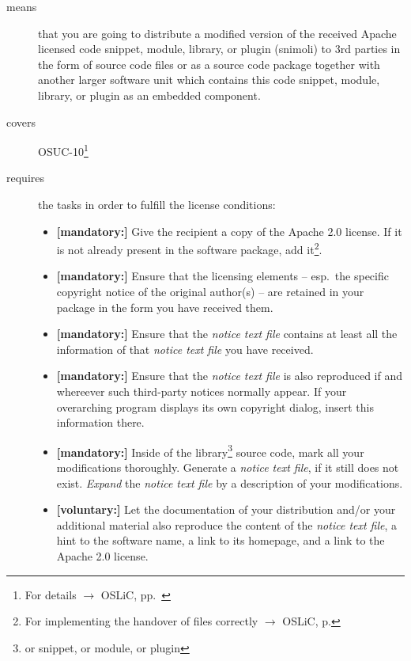 \begin{description}
\item[means] that you are going to distribute a modified version of the received
Apache licensed code snippet, module, library, or plugin (snimoli) to 3rd
parties in the form of source code files or as a source code package together
with another larger software unit which contains this code snippet, module,
library, or plugin as an embedded component.
\item[covers] OSUC-10\footnote{For details $\rightarrow$ OSLiC, pp.\ \pageref{OSUC-10-DEF}}
\item[requires] the tasks in order to fulfill the license conditions:
\begin{itemize}
  
  \item \textbf{[mandatory:]} Give the recipient a copy of the Apache 2.0
  license. If it is not already present in the software package, add
  it\footnote{For implementing the handover of files correctly $\rightarrow$
  OSLiC, p. \pageref{DistributingFilesHint}}.

  \item \textbf{[mandatory:]} Ensure that the licensing elements -- esp.\ the
  specific copyright notice of the original author(s) -- are retained in your
  package in the form you have received them.
  
  \item \textbf{[mandatory:]} Ensure that the \emph{notice text file} contains at least
  all the information of that \emph{notice text file} you have received.
 
  \item \textbf{[mandatory:]} Ensure that the \emph{notice text file} is also
  reproduced if and whereever such third-party notices normally appear. If your
  overarching program displays its own copyright dialog, insert this information
  there.
 
  \item \textbf{[mandatory:]} Inside of the library\footnote{or snippet, or
  module, or plugin} source code, mark all your modifications thoroughly.
  Generate a \emph{notice text file}, if it still does not exist. \emph{Expand}
  the \emph{notice text file} by a description of your modifications.
  
  \item \textbf{[voluntary:]} Let the documentation of your distribution and/or
  your additional material also reproduce the content of the \emph{notice text
  file}, a hint to the software name, a link to its homepage, and a link to the
  Apache 2.0 license.


\end{itemize}
\end{description}
